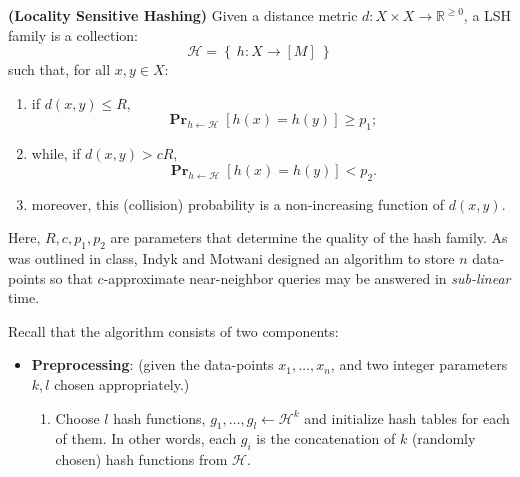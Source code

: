 \documentclass[solution,addpoints,12pt]{exam}
\newcommand{\brac}[1]{\left[ #1 \right]}
\newcommand{\curly}[1]{\left\{ #1 \right\}}
\newcommand{\prob}{\operatorname{\mathbf{Pr}}}
\newcommand{\from}{\leftarrow}
\newcommand{\reals}{\mathbb{R}}
\newcommand{\hashFamily}{\mathcal{H}}
\begin{document}
\begin{questions}

\question[15] \textbf{(Locality Sensitive Hashing)}  Given a distance metric $d: X \times X \to \reals^{\ge 0}$, a LSH family is a collection:
\[ \hashFamily = \curly{\ h: X \to [M]\ } \]
such that, for all $x, y \in X$:
\begin{enumerate}
  \item if $d(x, y) \le R$, $$\prob_{h \from \hashFamily} \brac{h(x) = h(y)} \ge p_1;$$

  \item while, if $d(x, y) > cR$, $$\prob_{h \from \hashFamily} \brac{h(x) = h(y)} < p_2.$$

  \item moreover, this (collision) probability is a non-increasing function of $d(x, y).$
\end{enumerate}

Here, $R, c, p_1, p_2$ are parameters that determine the quality of the hash family.  As was outlined in class, Indyk and Motwani designed an algorithm to store $n$ data-points so that $c$-approximate near-neighbor queries may be answered in \emph{sub-linear} time.

Recall that the algorithm consists of two components:

\begin{itemize}
\item \textbf{Preprocessing}:  (given the data-points $x_1, \ldots, x_n$, and two integer parameters $k, l$ chosen appropriately.)

  \begin{enumerate}

  \item Choose $l$ hash functions, $g_1, \ldots, g_l \from \hashFamily^{k}$ and initialize hash tables for each of them.  In other words, each $g_i$ is the concatenation of $k$ (randomly chosen) hash functions from $\hashFamily$.


\end{enumerate}
\end{itemize}
\end{questions}
\end{document}
